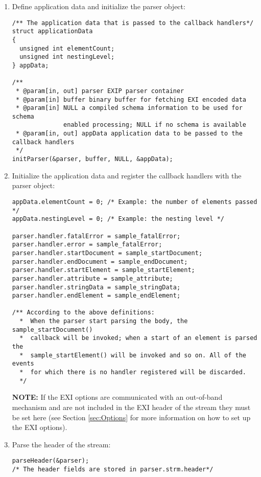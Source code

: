 \begin{enumerate}
 \item Define application data and initialize the parser object:
\begin{lstlisting}
/** The application data that is passed to the callback handlers*/
struct applicationData
{
  unsigned int elementCount;
  unsigned int nestingLevel;
} appData;

/**
 * @param[in, out] parser EXIP parser container
 * @param[in] buffer binary buffer for fetching EXI encoded data
 * @param[in] NULL a compiled schema information to be used for schema
		      enabled processing; NULL if no schema is available
 * @param[in, out] appData application data to be passed to the callback handlers
 */  
initParser(&parser, buffer, NULL, &appData);    
\end{lstlisting}

 \item Initialize the application data and register the callback handlers with the parser object:
\begin{lstlisting}
appData.elementCount = 0; /* Example: the number of elements passed */
appData.nestingLevel = 0; /* Example: the nesting level */

parser.handler.fatalError = sample_fatalError;
parser.handler.error = sample_fatalError;
parser.handler.startDocument = sample_startDocument;
parser.handler.endDocument = sample_endDocument;
parser.handler.startElement = sample_startElement;
parser.handler.attribute = sample_attribute;
parser.handler.stringData = sample_stringData;
parser.handler.endElement = sample_endElement;

/** According to the above definitions:
  *  When the parser start parsing the body, the sample_startDocument()
  *  callback will be invoked; when a start of an element is parsed the
  *  sample_startElement() will be invoked and so on. All of the events
  *  for which there is no handler registered will be discarded. 
  */
\end{lstlisting}

\textbf{NOTE:} If the EXI options are communicated with an out-of-band mechanism and are
not included in the EXI header of the stream they must be set here
(see Section \ref{sec:Options} for more information on how to set up
the EXI options).

 \item Parse the header of the stream:
\begin{lstlisting}
parseHeader(&parser);
/* The header fields are stored in parser.strm.header*/
\end{lstlisting}


\end{enumerate}
